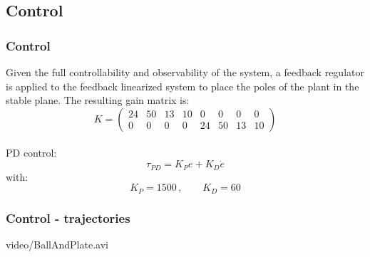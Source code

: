 \subsection{Control}
%
\begin{frame}
\frametitle{Control}
Given the full controllability and observability of the system, a feedback regulator is applied to the feedback linearized system to place the poles of the plant in the stable plane. The resulting gain matrix is:
\begin{equation*}
	K =%
	\begin{pmatrix}
		24 &50 &13 &10 &0 &0 &0 &0 \\
		0 &0 &0 &0 &24 &50 &13 &10
	\end{pmatrix}
\end{equation*}\\[8pt]
PD control:
\begin{equation*}
\tau_{PD}= K_Pe + K_D\dot{e}
\end{equation*}
with:
\[ K_P = 1500\,, \qquad K_D = 60\]
\end{frame}
%
\begin{frame}
\frametitle{Control - trajectories}
\begin{center}
	{video/BallAndPlate.avi}
\end{center}
\end{frame}
%
